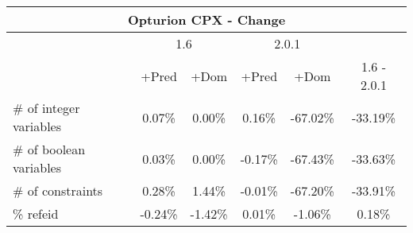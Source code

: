 \documentclass{standalone}
\begin{document}
\begin{table}[H]
\footnotesize
\begin{tabular}{lc|c|c|c|c}
\multicolumn{6}{c}{Opturion CPX - Change} \\ 
\hline\hline  & \multicolumn{2}{c|}{1.6} &\multicolumn{2}{c|}{2.0.1} &\\ 
\hline  & +Pred & +Dom & +Pred & +Dom & 1.6 - 2.0.1\\
\# of integer variables & 0.07\% & 0.00\% & 0.16\% & -67.02\% & -33.19\% \\ 
\# of boolean variables & 0.03\% & 0.00\% & -0.17\% & -67.43\% & -33.63\% \\ 
\# of constraints       & 0.28\% & 1.44\% & -0.01\% & -67.20\% & -33.91\% \\ 
\% refeid               & -0.24\% & -1.42\% & 0.01\% & -1.06\% & 0.18\%\\ 
\end{tabular} 
\end{table}
\end{document}
